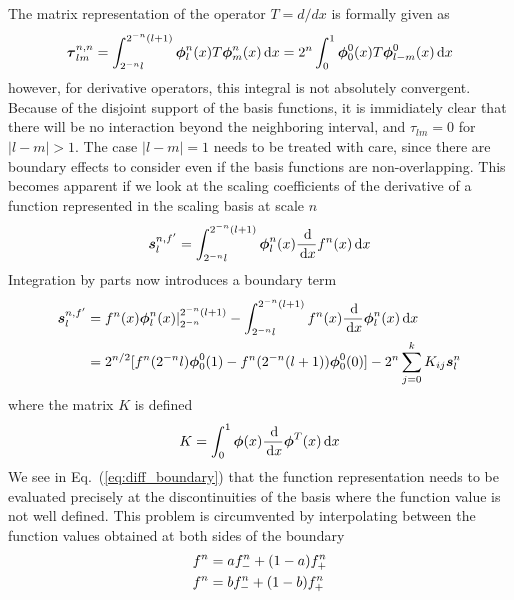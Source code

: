 The matrix representation of the operator $T=d/dx$ is formally given as
\begin{equation}
    \boldsymbol \tau_{lm}^{n,n} = \int_{2^{-n}l}^{2^{-n}(l+1)} \boldsymbol{\phi}_{l}^n(x) T \boldsymbol{\phi}_m^n(x) \,\mathrm{d} x
	= 2^n \int_0^1 \boldsymbol{\phi}_0^0(x) T \boldsymbol{\phi}_{l-m}^0(x) \,\mathrm{d} x
\end{equation}
however, for derivative operators, this integral is not absolutely convergent. 
Because of the disjoint support of the basis functions, it is immidiately clear that
there will be no interaction beyond the neighboring interval, and $\tau_{lm} = 0$ for
$|l-m| > 1$. The case $|l-m| = 1$ needs to be treated with care, since there are
boundary effects to consider even if the basis functions are non-overlapping. This
becomes apparent if we look at the scaling coefficients of the derivative  of
a function  represented in the scaling basis at scale $n$
\begin{equation}
    \boldsymbol {s}_{l}^{n,f'} = \int_{2^{-n}l}^{2^{-n}(l+1)} 
	\boldsymbol{\phi}_l^n(x) \frac{\,\mathrm{d}}{\,\mathrm{d} x} {f}^{n}(x) \,\mathrm{d} x 
\end{equation}
Integration by parts now introduces a boundary term
\begin{align}
    \boldsymbol {s}_{l}^{n,f'} 
    &= {f}^{n}(x)\boldsymbol{\phi}_l^n(x)|_{2^{-n}}^{2^{-n}(l+1)}
	- \int_{2^{-n}l}^{2^{-n}(l+1)} {f}^{n}(x) \frac{\,\mathrm{d}}{\,\mathrm{d} x} \boldsymbol{\phi}_l^n(x) \,\mathrm{d} x \\
    \label{eq:diff_boundary}
    &= 2^{n/2} [{f}^{n}(2^{-n}l)\boldsymbol{\phi}_0^0(1) - 
	{f}^{n}(2^{-n}(l+1))\boldsymbol{\phi}_0^0(0)] - 2^n\sum_{j=0}^{k} K_{ij}\boldsymbol {s}_l^n
\end{align}
where the matrix $K$ is defined
\begin{equation}
    K = \int_0^1 \boldsymbol{\phi}(x) \frac{\,\mathrm{d}}{\,\mathrm{d} x} \boldsymbol{\phi}^T(x) \,\mathrm{d} x
\end{equation}
We see in Eq.~(\ref{eq:diff_boundary}) that the function representation  
needs to be evaluated precisely at the discontinuities of the
basis where the function value is not well defined. This problem is circumvented
by interpolating between the function values obtained at both sides of the boundary
\begin{align}
    {f}^{n} &= a{f}^{n}_{-} + (1-a) {f}^{n}_{+}\\
    {f}^{n} &= b{f}^{n}_{-} + (1-b) {f}^{n}_{+}
\end{align}
